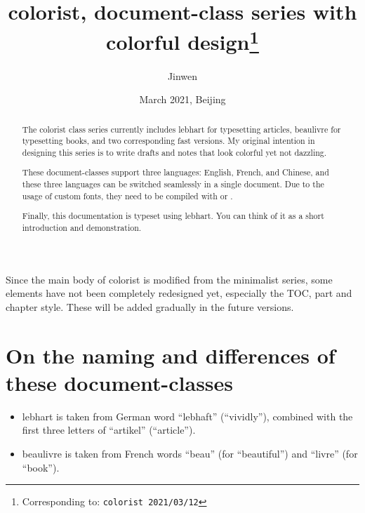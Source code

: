 \documentclass{lebhart}
\providecommand{\colorist}{\textsf{colorist}}
\providecommand{\lebhart}{\textsf{lebh\-art}}
\providecommand{\beaulivre}{\textsf{beau\-livre}}
\begin{document}
\title{\colorist{}, document-class series with colorful design\thanks{Corresponding to: \texttt{\colorist{} 2021/03/12}}}
\author{Jinwen}
\date{March 2021, Beijing}

\maketitle

\begin{abstract}
    The \colorist{} class series currently includes \lebhart{} for typesetting articles, \beaulivre{} for typesetting books, and two corresponding fast versions. My original intention in designing this series is to write drafts and notes that look colorful yet not dazzling.

    These document-classes support three languages: English, French, and Chinese, and these three languages can be switched seamlessly in a single document. Due to the usage of custom fonts, they need to be compiled with  or .
    
    Finally, this documentation is typeset using \lebhart{}. You can think of it as a short introduction and demonstration.
\end{abstract}

\begin{tcolorbox}[enhanced jigsaw,pad at break*=1mm,breakable,colback=yellow!25!paper,boxrule=0pt,frame hidden]
    Since the main body of \colorist{} is modified from the \textsf{minimalist} series, some elements have not been completely redesigned yet, especially the TOC, part and chapter style. These will be added gradually in the future versions.
\end{tcolorbox}

\tableofcontents

\section{On the naming and differences of these document-classes}
\begin{itemize}
    \item \lebhart{} is taken from German word ``lebhaft'' (``vividly''), combined with the first three letters of ``artikel'' (``article'').
    \item \beaulivre{} is taken from French words ``beau'' (for ``beautiful'') and ``livre'' (for ``book'').
\end{itemize}
\end{document}
